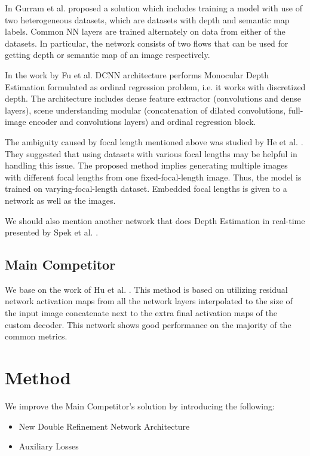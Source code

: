 \documentclass[10pt,twocolumn,letterpaper]{article}
\begin{document}
In \cite{gurram2018monocular} Gurram et al. proposed a solution which includes training a model with use of two heterogeneous datasets, which are datasets with depth and semantic map labels. Common NN layers are trained alternately on data from either of the datasets. In particular, the network consists of two flows that can be used for getting depth or semantic map of an image respectively.

In the work by Fu et al. \cite{fu2018deep} DCNN architecture performs Monocular Depth Estimation formulated as ordinal regression problem, i.e. it works with discretized depth. The architecture includes dense feature extractor (convolutions and dense layers), scene understanding modular (concatenation of dilated convolutions, full-image encoder and convolutions layers) and ordinal regression block.

The ambiguity caused by focal length mentioned above was studied by He et al. \cite{he2018learning}. They suggested that using datasets with various focal lengths may be helpful in handling this issue. The proposed method implies generating multiple images with different focal lengths from one fixed-focal-length image. Thus, the model is trained on varying-focal-length dataset. Embedded focal lengths is given to a network as well as the images.

We should also mention another network that does Depth Estimation in real-time presented by Spek et al. \cite{spek2018cream}.

\subsection{Main Competitor}

We base on the work of Hu et al. \cite{hu2018revisiting}. This method is based
on utilizing residual network activation maps from all the network layers interpolated to the size
of the input image concatenate next to the extra final activation maps of the
custom decoder. This network shows good performance on the majority of the common metrics.

\section{Method}

We improve the Main Competitor's solution by introducing the following:
\begin{itemize}
    \item New Double Refinement Network Architecture
    \item Auxiliary Losses
\end{itemize}
\end{document}

